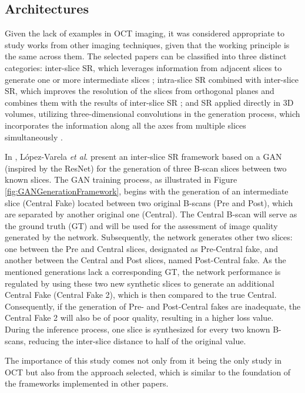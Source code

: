 \subsection{Architectures}
Given the lack of examples in OCT imaging, it was considered appropriate to study works from other imaging techniques, given that the working principle is the same across them. The selected papers can be classified into three distinct categories: inter-slice SR, which leverages information from adjacent slices to generate one or more intermediate slices \cite{Lopez2023, Xia2021, Wu2022, Nishimoto2024}; intra-slice SR combined with inter-slice SR, which improves the resolution of the slices from orthogonal planes and combines them with the results of inter-slice SR \cite{Zhang2024, Fang2022, Nimitha2024, Georgescu2020}; and SR applied directly in 3D volumes, utilizing three-dimensional convolutions in the generation process, which incorporates the information along all the axes from multiple slices simultaneously \cite{YChen2018, Sanchez2018, Kudo2019, Zhang2022}.
\par
In \cite{Lopez2023}, López-Varela \textit{et al}. present an inter-slice SR framework based on a GAN (inspired by the ResNet) for the generation of three B-scan slices between two known slices. The GAN training process, as illustrated in Figure \ref{fig:GANGenerationFramework}, begins with the generation of an intermediate slice (Central Fake) located between two original B-scans (Pre and Post), which are separated by another original one (Central). The Central B-scan will serve as the ground truth (GT) and will be used for the assessment of image quality generated by the network. Subsequently, the network generates other two slices: one between the Pre and Central slices, designated as Pre-Central fake, and another between the Central and Post slices, named Post-Central fake. As the mentioned generations lack a corresponding GT, the network performance is regulated by using these two new synthetic slices to generate an additional Central Fake (Central Fake 2), which is then compared to the true Central. Consequently, if the generation of Pre- and Post-Central fakes are inadequate, the Central Fake 2 will also be of poor quality, resulting in a higher loss value. During the inference process, one slice is synthesized for every two known B-scans, reducing the inter-slice distance to half of the original value.
\par
The importance of this study comes not only from it being the only study in OCT but also from the approach selected, which is similar to the foundation of the frameworks implemented in other papers. 

